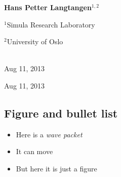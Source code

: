 \documentclass[%
oneside,                 %
final,                   %
10pt]{article}
\begin{document}
\begin{center}
\author{Hans Petter Langtangen}

\begin{center}
{\bf Hans Petter Langtangen${}^{1, 2}$} \\ [0mm]
\end{center}

\begin{center}
\centerline{{\small ${}^1$Simula Research Laboratory}}
\centerline{{\small ${}^2$University of Oslo}}
\end{center}


\date{Aug 11, 2013}
\maketitle
\date{Aug 11, 2013
}

\ \\ [10mm]
{\large\textsf{Aug 11, 2013}}

\end{center}
\vfill
\clearpage

\begin{center}
Aug 11, 2013
\end{center}

\vspace{1cm}




\subsection{Figure and bullet list}


\begin{itemize}
  \item Here is a \emph{wave packet}

  \item It can move

  \item But here it is just a figure
\end{itemize}

\noindent
\end{document}
